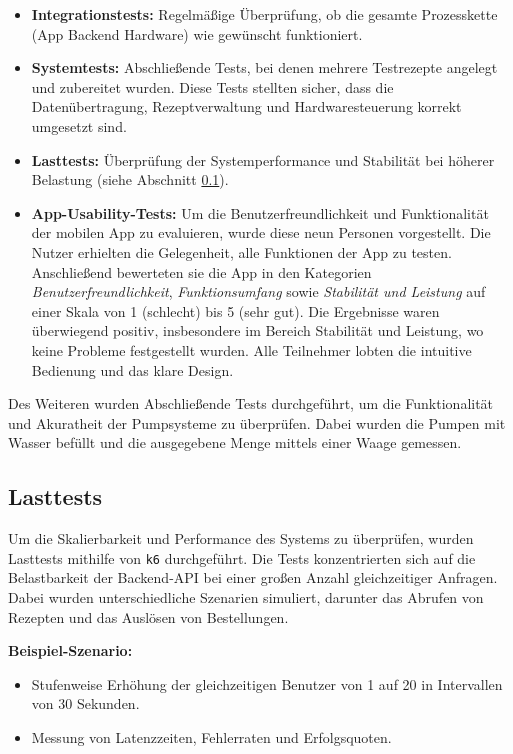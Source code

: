 \begin{itemize}
  \item \textbf{Integrationstests:} Regelmäßige Überprüfung, ob die gesamte Prozesskette 
    (App \textrightarrow{} Backend \textrightarrow{} Hardware) wie gewünscht funktioniert.
  \item \textbf{Systemtests:} Abschließende Tests, bei denen mehrere Testrezepte angelegt und 
    zubereitet wurden. Diese Tests stellten sicher, dass die Datenübertragung, Rezeptverwaltung und 
    Hardwaresteuerung korrekt umgesetzt sind.
  \item \textbf{Lasttests:} Überprüfung der Systemperformance und Stabilität bei höherer Belastung 
    (siehe Abschnitt \ref{subsec:lasttests}).
  \item \textbf{App-Usability-Tests:} Um die Benutzerfreundlichkeit und Funktionalität der mobilen 
    App zu evaluieren, wurde diese neun Personen vorgestellt. Die Nutzer erhielten die Gelegenheit, 
    alle Funktionen der App zu testen. Anschließend bewerteten sie die App in den Kategorien 
    \textit{Benutzerfreundlichkeit}, \textit{Funktionsumfang} sowie \textit{Stabilität und Leistung} 
    auf einer Skala von 1 (schlecht) bis 5 (sehr gut). Die Ergebnisse waren überwiegend positiv, 
    insbesondere im Bereich Stabilität und Leistung, wo keine Probleme festgestellt wurden. Alle 
    Teilnehmer lobten die intuitive Bedienung und das klare Design.
\end{itemize}

Des Weiteren wurden Abschließende Tests durchgeführt, um die Funktionalität und Akuratheit der 
Pumpsysteme zu überprüfen. Dabei wurden die Pumpen mit Wasser befüllt und die ausgegebene Menge
mittels einer Waage gemessen.

\subsection{Lasttests}
\label{subsec:lasttests}

Um die Skalierbarkeit und Performance des Systems zu überprüfen, wurden Lasttests mithilfe von 
\texttt{k6} durchgeführt. Die Tests konzentrierten sich auf die Belastbarkeit der Backend-API bei 
einer großen Anzahl gleichzeitiger Anfragen. Dabei wurden unterschiedliche Szenarien simuliert, 
darunter das Abrufen von Rezepten und das Auslösen von Bestellungen.\newline

\textbf{Beispiel-Szenario:}
\begin{itemize}
  \item Stufenweise Erhöhung der gleichzeitigen Benutzer von 1 auf 20 in Intervallen von 30 Sekunden.
  \item Messung von Latenzzeiten, Fehlerraten und Erfolgsquoten.
\end{itemize}

